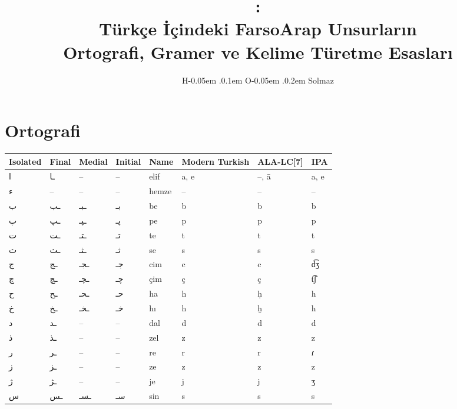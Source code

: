 \documentclass[a5paper,12pt]{scrbook}
\title{\Huge\fat:\\[0.6ex] \large Türkçe İçindeki FarsoArap Unsurların \\
  Ortografi, Gramer ve Kelime Türetme Esasları}
\author{H\kern -0.05em .\kern 0.1em O\kern -0.05em .\kern 0.2em Solmaz}
\date{}
\begin{document}
\maketitle
\tableofcontents

\chapter{Ortografi}

\begin{longtable}{p{2em}p{2em}p{2em}p{2em}p{2em}p{2em}p{2em}p{2em}}
Isolated & Final & Medial & Initial & Name & Modern Turkish & ALA-LC[7] & IPA \\
\toprule
\textarabic{ ا‎ } & \textarabic{ ـا‎ } & -- & -- & elif & a, e & --, ā & a, e \\
\textarabic{ ء‎ } & -- & -- & -- & hemze  & -- &  -- & -- \\
\textarabic{ ب‎ } & \textarabic{ ـب‎ } & \textarabic{ ـبـ‎ } & \textarabic{ بـ‎ } & be & b & b & b \\
\textarabic{ پ‎ } & \textarabic{ ـپ‎ } & \textarabic{ ـپـ‎ } & \textarabic{ پـ‎ } & pe & p & p & p \\
\textarabic{ ت‎ } & \textarabic{ ـت‎ } & \textarabic{ ـتـ‎ } & \textarabic{ تـ‎ } & te & t & t & t \\
\textarabic{ ث‎ } & \textarabic{ ـث‎ } & \textarabic{ ـثـ‎ } & \textarabic{ ثـ‎ } & se & s & s & s \\
\textarabic{ ج‎ } & \textarabic{ ـج‎ } & \textarabic{ ـجـ‎ } & \textarabic{ جـ‎ } & cim & c & c & d͡ʒ \\
\textarabic{ چ‎ } & \textarabic{ ـچ‎ } & \textarabic{ ـچـ‎ } & \textarabic{ چـ‎ } & çim & ç & ç & t͡ʃ \\
\textarabic{ ح‎ } & \textarabic{ ـح‎ } & \textarabic{ ـحـ‎ } & \textarabic{ حـ‎ } & ha & h & ḥ & h \\
\textarabic{ خ‎ } & \textarabic{ ـخ‎ } & \textarabic{ ـخـ‎ } & \textarabic{ خـ‎ } & hı & h & ḫ & h \\
\textarabic{ د‎ } & \textarabic{ ـد‎ } & -- & -- & dal & d & d & d \\
\textarabic{ ذ‎ } & \textarabic{ ـذ‎ } & -- & -- & zel & z & z & z \\
\textarabic{ ر‎ } & \textarabic{ ـر‎ } & -- & -- & re & r & r & ɾ \\
\textarabic{ ز‎ } & \textarabic{ ـز‎ } & -- & -- & ze & z & z & z \\
\textarabic{ ژ‎ } & \textarabic{ ـژ‎ } & -- & -- & je & j & j & ʒ \\
\textarabic{ س‎ } & \textarabic{ ـس‎ } & \textarabic{ ـسـ‎ } & \textarabic{ سـ‎ } & sin & s & s & s \\

\end{longtable}
\end{document}
